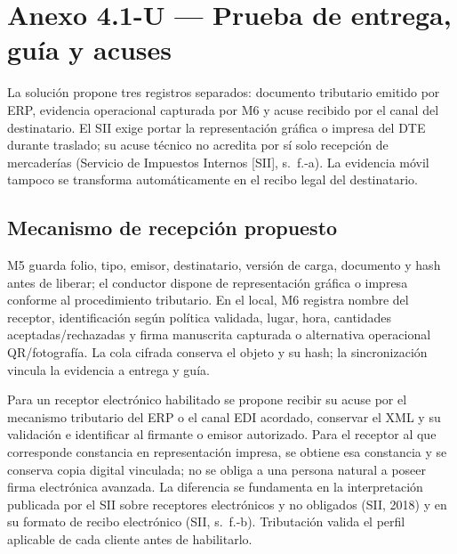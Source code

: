 \clearpage
\section*{Anexo 4.1-U --- Prueba de entrega, guía y acuses}
\label{anx:U}
La solución propone tres registros separados: documento tributario emitido por ERP, evidencia operacional capturada por M6 y acuse recibido por el canal del destinatario. El SII exige portar la representación gráfica o impresa del DTE durante traslado; su acuse técnico no acredita por sí solo recepción de mercaderías (Servicio de Impuestos Internos [SII], s.~f.-a). La evidencia móvil tampoco se transforma automáticamente en el recibo legal del destinatario.

\subsection*{Mecanismo de recepción propuesto}
M5 guarda folio, tipo, emisor, destinatario, versión de carga, documento y hash antes de liberar; el conductor dispone de representación gráfica o impresa conforme al procedimiento tributario. En el local, M6 registra nombre del receptor, identificación según política validada, lugar, hora, cantidades aceptadas/rechazadas y firma manuscrita capturada o alternativa operacional QR/fotografía. La cola cifrada conserva el objeto y su hash; la sincronización vincula la evidencia a entrega y guía.

Para un receptor electrónico habilitado se propone recibir su acuse por el mecanismo tributario del ERP o el canal EDI acordado, conservar el XML y su validación e identificar al firmante o emisor autorizado. Para el receptor al que corresponde constancia en representación impresa, se obtiene esa constancia y se conserva copia digital vinculada; no se obliga a una persona natural a poseer firma electrónica avanzada. La diferencia se fundamenta en la interpretación publicada por el SII sobre receptores electrónicos y no obligados (SII, 2018) y en su formato de recibo electrónico (SII, s.~f.-b). Tributación valida el perfil aplicable de cada cliente antes de habilitarlo.

